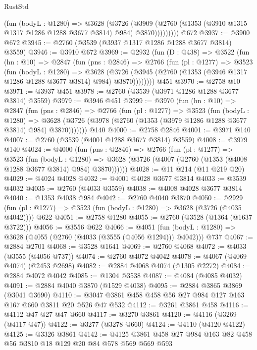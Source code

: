 \begin{lexlean}{RustStd}
\begin{coremodule}
              (fun (bodyL : @1280) =>
              @3628
                (@3726
                  (@3909
                    (@2760 (@1353 (@3910 @1315 @1317 @1286 @1288 @3677 @3814) @984) @3870)))))))))
    @672
@3937 := @3900 @672
@3945 := @2760 (@3539 (@3937 @1317 @1286 @1288 @3677 @3814) @3559)
@3946 := @3910 @672
@3969 := @2932
    (fun (D : @438) =>
    @3522
      (fun (hn : @10) =>
      @2847
        (fun (pns : @2846) =>
        @2766
          (fun (pl : @1277) =>
          @3523
            (fun (bodyL : @1280) =>
            @3628
              (@3726 (@3945 (@2760 (@1353 (@3946 @1317 @1286 @1288 @3677 @3814) @984) @3870))))))))
    @451
@3970 := @2758 @10
@3971 := @3937 @451
@3978 := @2760 (@3539 (@3971 @1286 @1288 @3677 @3814) @3559)
@3979 := @3946 @451
@3999 := @3970
    (fun (hn : @10) =>
    @2847
      (fun (pns : @2846) =>
      @2766
        (fun (pl : @1277) =>
        @3523
          (fun (bodyL : @1280) =>
          @3628 (@3726 (@3978 (@2760 (@1353 (@3979 @1286 @1288 @3677 @3814) @984) @3870)))))))
    @140
@4000 := @2758 @2846
@4001 := @3971 @140
@4007 := @2760 (@3539 (@4001 @1288 @3677 @3814) @3559)
@4008 := @3979 @140
@4024 := @4000
    (fun (pns : @2846) =>
    @2766
      (fun (pl : @1277) =>
      @3523
        (fun (bodyL : @1280) =>
        @3628 (@3726 (@4007 (@2760 (@1353 (@4008 @1288 @3677 @3814) @984) @3870))))))
@4028 := @11 @214 (@11 @219 @20)
@4029 := @4024 @4028
@4032 := @4001 @4028 @3677 @3814
@4033 := @3539 @4032
@4035 := @2760 (@4033 @3559)
@4038 := @4008 @4028 @3677 @3814
@4040 := @1353 @4038 @984
@4042 := @2760 @4040 @3870
@4050 := @2929 (fun (pl : @1277) => @3523 (fun (bodyL : @1280) => @3628 (@3726 (@4035 @4042)))) @622
@4051 := @2758 @1280
@4055 := @2760 (@3528 (@1364 (@1637 @3722)))
@4056 := @3556 @622
@4066 := @4051
    (fun (bodyL : @1280) => @3628 (@4055 (@2760 (@4033 (@3555 (@4056 @1294))) @4042)))
    @737
@4067 := @2884 @2701
@4068 := @3528 @1641
@4069 := @2760 @4068
@4072 := @4033 (@3555 (@4056 @737))
@4074 := @2760 @4072 @4042
@4078 := @4067 (@4069 @4074) (@2453 @2698)
@4082 := @2884 @4068 @4074 (@1305 @2272)
@4084 := @2884 @4072 @4042
@4085 := @1304 @3538
@4087 := @4084 (@4085 @4032)
@4091 := @2884 @4040 @3870 (@1529 @4038)
@4095 := @2884 @3865 @3869 (@3041 @3690)
@4110 := @3047 @3861 @458 @458 @56 @27 @984 @127 @163 @167 @660 @3811 @20 @526 @47 @532
@4112 := @3261 @3861 @458
@4116 := @4112 @47 @27 @47 @660
@4117 := @3270 @3861
@4120 := @4116 (@3269 (@4117 @47))
@4122 := @3277 (@3278 @660)
@4124 := @4110 (@4120 @4122)
@4125 := @3326 @3861
@4142 := @4125 @3861 @458 @27 @984 @163 @82 @458 @56 @3810 @18 @129 @20 @84 @578 @569 @569 @593

\end{coremodule}
\end{lexlean}
